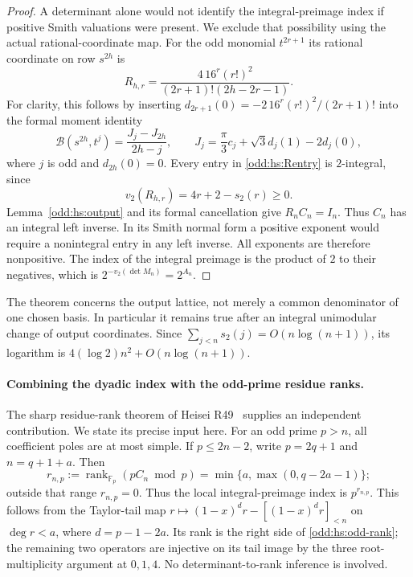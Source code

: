 \documentclass[11pt,a4paper]{article}
\numberwithin{equation}{section}
\theoremstyle{definition}\newtheorem{definition}[theorem]{Definition}
\theoremstyle{remark}\newtheorem{remark}[theorem]{Remark}
\begin{document}
\begin{proof}
A determinant alone would not identify the integral-preimage index if
positive Smith valuations were present. We exclude that possibility
using the actual rational-coordinate map. For the odd monomial
$t^{2r+1}$ its rational coordinate on row $s^{2h}$ is
\begin{equation}\label{odd:hs:Rentry}
 R_{h,r}=\frac{4\,16^r(r!)^2}
                   {(2r+1)!(2h-2r-1)}.
\end{equation}
For clarity, this follows by inserting
$d_{2r+1}(0)=-2\,16^r(r!)^2/(2r+1)!$ into the formal moment identity
\[
 \mathcal B(s^{2h},t^j)=\frac{J_j-J_{2h}}{2h-j},\qquad
 J_j=\frac\pi3c_j+\sqrt3d_j(1)-2d_j(0),
\]
where $j$ is odd and $d_{2h}(0)=0$. Every entry in \eqref{odd:hs:Rentry}
is $2$-integral, since
\[
 v_2(R_{h,r})=4r+2-s_2(r)\ge0.
\]
Lemma~\ref{odd:hs:output} and its formal cancellation give $R_nC_n=I_n$.
Thus $C_n$ has an integral left inverse. In its Smith normal form a
positive exponent would require a nonintegral entry in any left inverse.
All exponents are therefore nonpositive. The index of the integral
preimage is the product of $2$ to their negatives, which is
$2^{-v_2(\det M_n)}=2^{A_n}$.
\end{proof}

The theorem concerns the output lattice, not merely a common denominator
of one chosen basis. In particular it remains true after an integral
unimodular change of output coordinates. Since
$\sum_{j<n}s_2(j)=O(n\log(n+1))$, its logarithm is
$4(\log2)n^2+O(n\log(n+1))$.

\paragraph{Combining the dyadic index with the odd-prime residue ranks.}
The sharp residue-rank theorem of Heisei R49~\cite{H49} supplies an independent
contribution. We state its precise input here. For an odd prime $p>n$,
all coefficient poles are at most simple. If
$p\le2n-2$, write $p=2q+1$ and $n=q+1+a$. Then
\begin{equation}\label{odd:hs:odd-rank}
 r_{n,p}:=\operatorname{rank}_{\mathbb F_p}(pC_n\bmod p)
       =\min\{a,\max(0,q-2a-1)\};
\end{equation}
outside that range $r_{n,p}=0$. Thus the local integral-preimage index is
$p^{r_{n,p}}$. This follows from the Taylor-tail map
$r\mapsto(1-x)^dr-[(1-x)^dr]_{<n}$ on $\deg r<a$, where
$d=p-1-2a$. Its rank is the right side of \eqref{odd:hs:odd-rank}; the
remaining two operators are injective on its tail image by the three
root-multiplicity argument at $0,1,4$. No determinant-to-rank inference
is involved.
\end{document}
